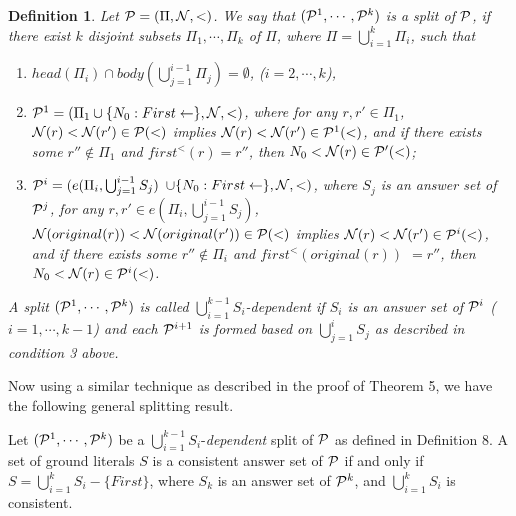 \documentclass{tlp}
\newtheorem{definition}{Definition} %
\begin{document}
\begin{definition}
Let ${\cal P}=(\Pi, {\cal N},<)$. We say that $({\cal P}^{1}, \cdots, {\cal P}^{k})$ is
a {\em split} of ${\cal P}$,
if there exist $k$ disjoint subsets $\Pi_{1},\cdots, \Pi_{k}$ of
$\Pi$, where $\Pi=\bigcup_{i=1}^{k}\Pi_{i}$,  such that
\begin{enumerate}
\item $head(\Pi_{i})\cap body(\bigcup_{j=1}^{i-1}\Pi_{j})=\emptyset$, ($i=2, \cdots, k$),
%
\item ${\cal P}^{1}=(\Pi_{1}\cup\{N_{0}: First\leftarrow\}, {\cal N},<)$, where
for any $r, r'\in \Pi_{1}$, ${\cal N}(r)<{\cal N}(r')\in {\cal P}(<)$ implies
${\cal N}(r)<{\cal N}(r')\in {\cal P}^{1}(<)$, and if there exists some
$r''\not\in \Pi_{1}$ and $first^{<}(r)=r''$, then $N_{0}<{\cal N}(r)\in {\cal P'}(<)$;
%
\item ${\cal P}^{i}=(e(\Pi_{i},\bigcup_{j=1}^{i-1} S_{j})$
$\cup\{N_{0}: First\leftarrow\}, {\cal N},<)$, where
$S_{j}$ is an answer set of ${\cal P}^{j}$,
for any $r, r'\in e(\Pi_{i},\bigcup_{j=1}^{i-1} S_{j})$,
${\cal N}(original(r))<{\cal N}(original(r'))\in {\cal P}(<)$ implies
${\cal N}(r)<{\cal N}(r')\in {\cal P}^{i}(<)$, and if there exists some
$r''\not\in \Pi_{i}$ and $first^{<}(original(r))$ $=r''$,
then $N_{0}<{\cal N}(r)\in {\cal P}^{i}(<)$.
\end{enumerate}
A split $({\cal P}^{1},\cdots, {\cal P}^{k})$ is called
$\bigcup_{i=1}^{k-1}S_i$-{\em dependent} if
$S_i$ is an answer set of ${\cal P}^{i}$ ($i=1,\cdots,k-1$) 
and each ${\cal P}^{i+1}$ is formed based on 
$\bigcup_{j=1}^{i}S_j$ as described in condition 3 above.
\end{definition}

Now using a similar technique as described in the proof of Theorem 5, we
have the following general splitting result.

\begin{theorem}
Let $({\cal P}^{1}, \cdots, {\cal P}^{k})$ be a 
$\bigcup_{i=1}^{k-1}S_i$-{\em dependent} split of ${\cal P}$ as defined in
Definition 8.  A set of ground literals $S$
is a consistent answer set of ${\cal P}$ if and only if
$S=\bigcup_{i=1}^{k} S_{i}-\{First\}$, where $S_{k}$ is an answer set of
${\cal P}^{k}$, and $\bigcup_{i=1}^{k} S_{i}$ is consistent.
\end{theorem}
\end{document}

